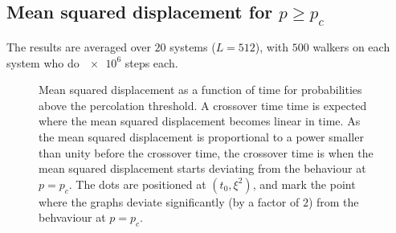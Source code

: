 \documentclass[11pt,british,a4paper]{report}
\begin{document}
\subsection{Mean squared displacement for \(p\geq p_c\)}
The results are averaged over \(20\) systems (\(L=512\)), with \(500\) walkers on each system who do \(\num{e6}\) steps each.
\begin{figure}[H]
    \centering
    \caption{Mean squared displacement as a function of time for probabilities above the percolation threshold. A crossover time time is expected where the mean squared displacement becomes linear in time. As the mean squared displacement is proportional to a power smaller than unity before the crossover time, the crossover time is when the mean squared displacement starts deviating from the behaviour at \(p=p_c\). The dots are positioned at \((t_0,\xi^2)\), and mark the point where the graphs deviate significantly (by a factor of \(2\)) from the behvaviour at \(p=p_c\).}%
    \label{fig:r2p}
\end{figure}
\end{document}

